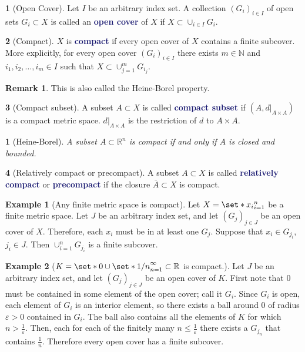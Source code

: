\documentclass[12pt]{article}
\numberwithin{equation}{section}
\newcommand{\navy}[1]{\textcolor{MidnightBlue}{\bf #1}}
\theoremstyle{plain}
\newtheorem{theorem}{\color{ForestGreen}{\textbf{Theorem}}}[section]
\theoremstyle{definition}
\newtheorem{definition}{\color{MidnightBlue}{\textbf{Definition}}}[section]
\newtheorem{example}{\color{WildStrawberry}Example}[section]
\newtheorem*{remark}{Remark}
\def\Set{\set*}%
\def\ss{\subset}
\newcommand{\1}{\mathbbm 1}
\newcommand{\e}{\varepsilon}
\newcommand{\RR}{\mathbb R}
\newcommand{\NN}{\mathbb N}
\begin{document}
\begin{definition}[Open Cover]
	Let $I$ be an arbitrary index set. A collection $(G_i)_{i \in I}$ of open sets $G_i \subset X$ is called an \navy{open cover} of $X$ if $X \subset \cup_{i \in I} G_{i}$.
\end{definition}

\begin{definition}[Compact]
	$X$ is \navy{compact} if every open cover of $X$ contains a finite subcover. More explicitly, for every open cover $(G_i)_{i \in I}$ there exists $m \in \NN$ and $i_1, i_2, \ldots, i_m \in I$ such that $X \subset \cup_{j=1}^m G_{i_j}$.
	\begin{remark}
		This is also called the Heine-Borel property. 
	\end{remark}
\end{definition}

\begin{definition}[Compact subset]
	A subset $A \subset X$ is called \navy{compact subset} if $(A,d\vert_{A\times A})$ is a compact metric space. $d\vert_{A\times A}$ is the restriction of $d$ to $A \times A$.  
\end{definition}

\begin{theorem}[Heine-Borel]
	A subset $A \subset \RR^n$ is compact if and only if $A$ is closed and bounded.
\end{theorem}

\begin{definition}[Relatively compact or precompact]
	A subset $A \ss X$ is called \navy{relatively compact} or \navy{precompact} if the closure $\bar{A} \ss X$ is compact. 
\end{definition}

\begin{example}[Any finite metric space is compact]
	Let $X = \Set{x_i}_{i=1}^n$ be a finite metric space. Let $J$ be an arbitrary index set, and let $(G_j)_{j \in J}$ be an open cover of $X$. Therefore, each $x_i$ must be in at least one $G_j$. Suppose that $x_i \in G_{j_i}$, $j_i \in J$. Then $\cup_{i=1}^n G_{j_i}$ is a finite subcover. 
\end{example}

\begin{example}[$K = \Set{0} \cup \Set{1/n}_{n=1}^\infty \subset \RR$ is compact.]
	Let $J$ be an arbitrary index set, and let $(G_j)_{j \in J}$ be an open cover of $K$. First note that $0$ must be contained in some element of the open cover; call it $G_i$. Since $G_i$ is open, each element of $G_i$ is an interior element, so there exists a ball around $0$ of radius $\e > 0$ contained in $G_i$. The ball also contains all the elements of $K$ for which $n > \frac{1}{\e}$. Then, each for each of the finitely many $n \leq \frac{1}{\e}$ there exists a $G_{j_n}$ that contains $\frac{1}{n}$. Therefore every open cover has a finite subcover.
\end{example}
\end{document}
